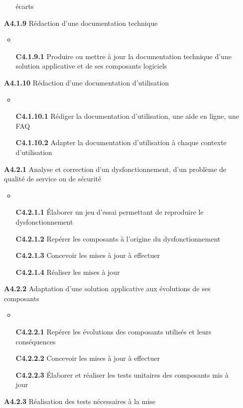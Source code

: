 \documentclass[12pt,a4paper,oneside,titlepage,final]{article}
\begin{document}
\begin{enumerate}
\begin{itemize}
    écarts
  \end{itemize}
  \item [\textbf{A4.1.9}] Rédaction d'une documentation technique
  \begin{itemize}
    \item \item [\textbf{C4.1.9.1}] Produire ou mettre à jour la
    documentation technique d'une solution applicative et de ses
    composants logiciels
  \end{itemize}
  \item [\textbf{A4.1.10}] Rédaction d'une documentation d'utilisation
  \begin{itemize}
    \item \item [\textbf{C4.1.10.1}] Rédiger la documentation
    d'utilisation, une aide en ligne, une FAQ
    \item [\textbf{C4.1.10.2}] Adapter la documentation d'utilisation
    à chaque contexte d'utilisation
  \end{itemize}
  \item [\textbf{A4.2.1}] Analyse et correction d'un
  dysfonctionnement, d'un problème de qualité de service ou de
  sécurité
  \begin{itemize}
    \item \item [\textbf{C4.2.1.1}] Élaborer un jeu d'essai permettant
    de reproduire le dysfonctionnement
    \item [\textbf{C4.2.1.2}] Repérer les composants à l'origine du
    dysfonctionnement
    \item [\textbf{C4.2.1.3}] Concevoir les mises à jour à effectuer
    \item [\textbf{C4.2.1.4}] Réaliser les mises à jour
  \end{itemize}
  \item [\textbf{A4.2.2}] Adaptation d'une solution applicative aux
  évolutions de ses composants
  \begin{itemize}
    \item \item [\textbf{C4.2.2.1}] Repérer les évolutions des
    composants utilisés et leurs conséquences
    \item [\textbf{C4.2.2.2}] Concevoir les mises à jour à effectuer
    \item [\textbf{C4.2.2.3}] Élaborer et réaliser les tests unitaires
    des composants mis à jour
  \end{itemize}
  \item [\textbf{A4.2.3}] Réalisation des tests nécessaires à la mise

\end{enumerate}
\end{document}

